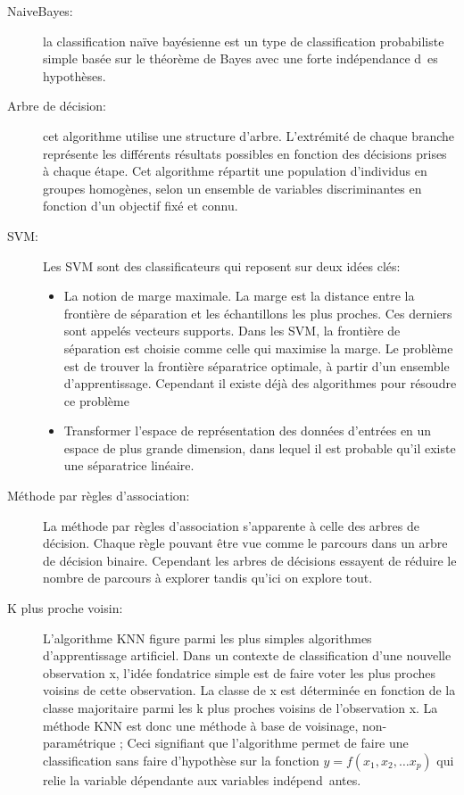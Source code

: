 \documentclass[a4paper, 11pt]{article}
\begin{document}
\begin{description}
 \item [NaiveBayes: ] la classification naïve bayésienne est un type de classification probabiliste simple basée sur le théorème de Bayes avec une forte indépendance d\
es
 hypothèses. \\

 \item [Arbre de décision: ] cet algorithme utilise une structure d'arbre. L'extrémité de chaque branche représente les différents résultats possibles
 en fonction des décisions prises à chaque étape. Cet algorithme  répartit une population d'individus en groupes homogènes, selon un ensemble
 de variables discriminantes en fonction d'un objectif fixé et connu.\\

 \item [SVM: ] Les SVM sont des classificateurs qui reposent sur deux idées clés:

\begin{itemize}
 \item La notion de marge maximale. La marge est la distance entre la frontière de séparation et les échantillons les plus proches.
Ces derniers sont appelés vecteurs supports. Dans les SVM, la frontière de séparation est choisie comme celle qui maximise la marge.
Le problème est de trouver la frontière séparatrice optimale, à partir d'un ensemble d'apprentissage. Cependant il existe déjà des algorithmes pour résoudre ce
problème
 \item  Transformer l'espace de représentation des données d'entrées en un espace de plus grande dimension, dans lequel il est probable qu'il existe une
 séparatrice linéaire. \\
\end{itemize}
 \item [Méthode par règles d'association: ] La méthode par règles d’association s’apparente à celle des arbres de décision. Chaque règle pouvant être
 vue comme le parcours dans un arbre de décision binaire. Cependant les arbres de décisions essayent de réduire le nombre de parcours à explorer tandis
 qu’ici on explore tout.\\

 \item [K plus proche voisin: ] L’algorithme KNN figure parmi les plus simples algorithmes d’apprentissage artificiel. Dans un contexte de classification d’une
 nouvelle observation x, l’idée fondatrice simple est de faire voter les plus proches voisins de cette observation. La classe de x est déterminée en fonction de la
 classe majoritaire parmi les k plus proches voisins de l’observation x. La méthode KNN est donc une méthode à base de voisinage, non-paramétrique ; Ceci signifiant
 que l’algorithme permet de faire une classification sans faire d’hypothèse sur la fonction $y=f(x_1,x_2,…x_p)$ qui relie la variable dépendante aux variables indépend\
antes.
\end{description}
\end{document}
